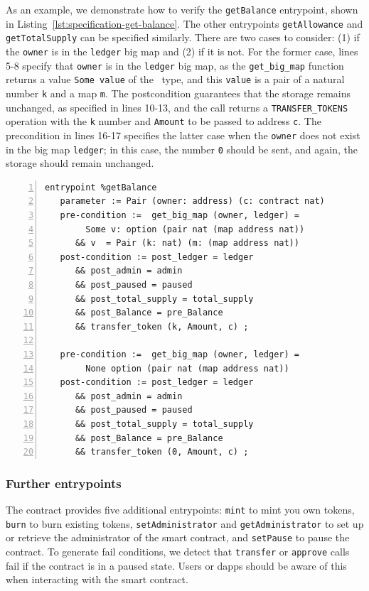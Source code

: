 \documentclass[a4paper,USenglish,cleveref, autoref, thm-restate]{lipics-v2021}
\begin{document}
As an example, we demonstrate how to verify the \lstinline/getBalance/
entrypoint,  shown in Listing~\ref{lst:specification-get-balance}. The
other entrypoints \lstinline/getAllowance/ and
\lstinline/getTotalSupply/ can be specified similarly.  There are two
cases to consider: (1) if the \lstinline/owner/ is in the
\lstinline/ledger/ big map and (2) if it is not. For the former case,
lines 5-8 specify that \lstinline/owner/ is in the \lstinline/ledger/
big map, as the \lstinline/get_big_map/ function returns a value
\lstinline/Some value/ of the \TOPTION\ type, and this
\lstinline/value/ is a pair of a natural number \lstinline/k/ and a
map \lstinline/m/. The postcondition guarantees that the storage
remains unchanged, as specified in lines 10-13, and the call returns a
\lstinline/TRANSFER_TOKENS/ operation with the \lstinline/k/ number
and \lstinline/Amount/ to be passed to address \lstinline/c/. The
precondition in lines 16-17 specifies the latter case when the
\lstinline/owner/ does not exist in the big map \lstinline/ledger/; in
this case, the number \lstinline/0/ should be sent, and again, the
storage should remain unchanged. 

\begin{lstlisting}[float=tp,captionpos=b,caption={Specification of the \lstinline/getBalance/ entrypoint},label={lst:specification-get-balance},numbers=left]
entrypoint %getBalance
   parameter := Pair (owner: address) (c: contract nat)
   pre-condition :=  get_big_map (owner, ledger) = 
        Some v: option (pair nat (map address nat)) 
      && v  = Pair (k: nat) (m: (map address nat))
   post-condition := post_ledger = ledger 
      && post_admin = admin 
      && post_paused = paused 
      && post_total_supply = total_supply 
      && post_Balance = pre_Balance 
      && transfer_token (k, Amount, c) ;

   pre-condition :=  get_big_map (owner, ledger) = 
        None option (pair nat (map address nat)) 
   post-condition := post_ledger = ledger 
      && post_admin = admin 
      && post_paused = paused 
      && post_total_supply = total_supply 
      && post_Balance = pre_Balance 
      && transfer_token (0, Amount, c) ;
\end{lstlisting}
\subsubsection{Further entrypoints}
\label{sec:other-entrypoints}

The contract provides five additional entrypoints: \lstinline/mint/ to
mint you own tokens, \lstinline/burn/ to burn existing tokens,
\lstinline/setAdministrator/ and \lstinline/getAdministrator/ to set
up or retrieve the administrator of the smart contract, and
\lstinline/setPause/ to pause the contract. To generate fail
conditions, we detect that \lstinline/transfer/ or \lstinline/approve/
calls fail if the contract is in a paused state. Users or dapps should
be aware of this when interacting with the smart contract. 
\end{document}
